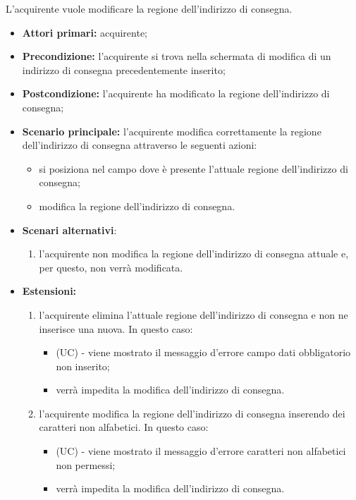 L'acquirente vuole modificare la regione dell'indirizzo di consegna.
\begin{itemize}
    \item \textbf{Attori primari:} acquirente;
    \item \textbf{Precondizione:} l'acquirente si trova nella schermata di modifica di un indirizzo di consegna precedentemente inserito;
    \item \textbf{Postcondizione:} l'acquirente ha modificato la regione dell'indirizzo di consegna;
    \item \textbf{Scenario principale:} l'acquirente modifica correttamente la regione dell'indirizzo di consegna attraverso le seguenti azioni:
    \begin{itemize}
        \item si posiziona nel campo dove è presente l'attuale regione dell'indirizzo di consegna;
        \item modifica la regione dell'indirizzo di consegna.
    \end{itemize}
    \item \textbf{Scenari alternativi}:
    \begin{enumerate}[label=\lett]
        \item l'acquirente non modifica la regione dell'indirizzo di consegna attuale e, per questo, non verrà modificata.
    \end{enumerate}
    \item \textbf{Estensioni:}
    \begin{enumerate}[label=\lett]
        \item l'acquirente elimina l'attuale regione dell'indirizzo di consegna e non ne inserisce una nuova. In questo caso:
        \begin{itemize}
            \item (UC) - viene mostrato il messaggio d'errore campo dati obbligatorio non inserito;
            \item verrà impedita la modifica dell'indirizzo di consegna.
        \end{itemize}
        \item l'acquirente modifica la regione dell'indirizzo di consegna inserendo dei caratteri non alfabetici. In questo caso:
        \begin{itemize}
            \item (UC) - viene mostrato il messaggio d'errore caratteri non alfabetici non permessi;
            \item verrà impedita la modifica dell'indirizzo di consegna.
        \end{itemize}
    \end{enumerate}
\end{itemize}

